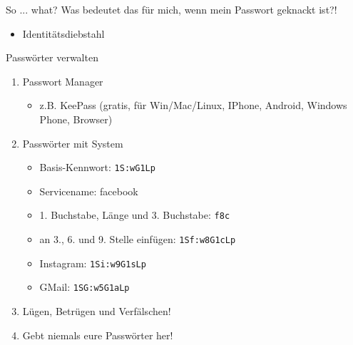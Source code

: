 \begin{frame}{So ... what?}
  Was bedeutet das für mich, wenn mein Passwort geknackt ist?!
  \begin{itemize}
    \item<2-> Identitätsdiebstahl
  \end{itemize}

\end{frame}


\begin{frame}{Passwörter verwalten}
  \begin{enumerate}
    \item<1-> Passwort Manager
      \begin{itemize}
        \item<2-> z.B. KeePass \tiny{(gratis, für Win/Mac/Linux, IPhone, Android, Windows Phone, Browser)}
      \end{itemize}
    \item<3-> Passwörter mit System
      \begin{itemize}
        \item<4->Basis-Kennwort: \hfill{\texttt{1S:wG1Lp}}
	\item<5->Servicename: \hfill{facebook}
	\item<6->1. Buchstabe, Länge und 3. Buchstabe: \hfill{\texttt{f8c}}
	\item<7->an 3., 6. und 9. Stelle einfügen: \hfill{\texttt{1S\alert{f}:w\alert{8}G1\alert{c}Lp}}
	\item<8->Instagram: \hfill{\texttt{1Si:w9G1sLp}}
	\item<9->GMail: \hfill{\texttt{1SG:w5G1aLp}}
      \end{itemize}
    \item<10-> Lügen, Betrügen und Verfälschen!
    \item<11-> \alert{Gebt niemals eure Passwörter her!}


  \end{enumerate}

\end{frame}

